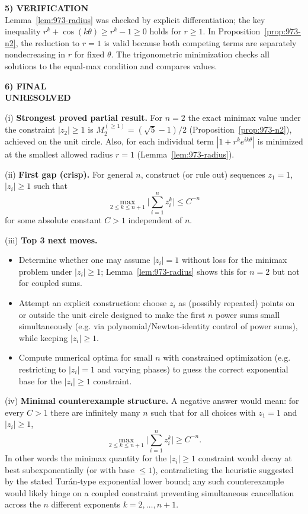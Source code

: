\medskip
\noindent\textbf{5) VERIFICATION}\\
Lemma~\ref{lem:973-radius} was checked by explicit differentiation; the key inequality $r^k+\cos(k\theta)\ge r^k-1\ge 0$ holds for $r\ge 1$.
In Proposition~\ref{prop:973-n2}, the reduction to $r=1$ is valid because both competing terms are separately nondecreasing in $r$ for fixed $\theta$.
The trigonometric minimization checks all solutions to the equal-max condition and compares values.

\medskip
\noindent\textbf{6) FINAL}\\
\textbf{UNRESOLVED}

(i) \textbf{Strongest proved partial result.} For $n=2$ the exact minimax value under the constraint $|z_2|\ge 1$ is $M_2^{(\ge 1)}=(\sqrt5-1)/2$ (Proposition~\ref{prop:973-n2}), achieved on the unit circle.  Also, for each individual term $|1+r^k e^{ik\theta}|$ is minimized at the smallest allowed radius $r=1$ (Lemma~\ref{lem:973-radius}).

(ii) \textbf{First gap (crisp).} For general $n$, construct (or rule out) sequences $z_1=1$, $|z_i|\ge 1$ such that
\[
\max_{2\le k\le n+1}\Big|\sum_{i=1}^n z_i^k\Big|\le C^{-n}
\]
for some absolute constant $C>1$ independent of $n$.

(iii) \textbf{Top 3 next moves.}
\begin{itemize}
\item Determine whether one may assume $|z_i|=1$ without loss for the minimax problem under $|z_i|\ge 1$; Lemma~\ref{lem:973-radius} shows this for $n=2$ but not for coupled sums.
\item Attempt an explicit construction: choose $z_i$ as (possibly repeated) points on or outside the unit circle designed to make the first $n$ power sums small simultaneously (e.g. via polynomial/Newton-identity control of power sums), while keeping $|z_i|\ge 1$.
\item Compute numerical optima for small $n$ with constrained optimization (e.g. restricting to $|z_i|=1$ and varying phases) to guess the correct exponential base for the $|z_i|\ge 1$ constraint.
\end{itemize}

(iv) \textbf{Minimal counterexample structure.} A negative answer would mean: for every $C>1$ there are infinitely many $n$ such that for all choices with $z_1=1$ and $|z_i|\ge 1$,
\[
\max_{2\le k\le n+1}\Big|\sum_{i=1}^n z_i^k\Big|\ge C^{-n}.
\]
In other words the minimax quantity for the $|z_i|\ge 1$ constraint would decay at best subexponentially (or with base $\le 1$), contradicting the heuristic suggested by the stated Tur\'an-type exponential lower bound; any such counterexample would likely hinge on a coupled constraint preventing simultaneous cancellation across the $n$ different exponents $k=2,\dots,n+1$.



